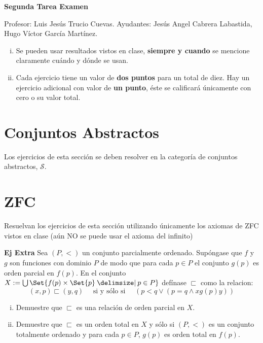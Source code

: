 \documentclass[11pt]{article}
\providecommand\st{\;|\;}
\newcommand\SetSymbol[1][]{%
    \nonscript\:#1\vert
    \allowbreak
    \nonscript\:
    \mathopen{}}
\renewcommand\st{\SetSymbol[\delimsize]}
\renewcommand\st{\SetSymbol[\delimsize]}
\newcommand{\topos}[1]{\mathscr{#1}}
\begin{document}
    \begin{center}
      \Huge \textbf{Segunda Tarea Examen} \\
    \end{center}
    \begin{flushright}
      \footnotesize Profesor: Luis Jesús Trucio Cuevas. \hfill Ayudantes: Jesús Angel Cabrera Labastida,\\
      \hfill Hugo Víctor García Martínez.
    \end{flushright}
    \footnotesize
    \begin{enumerate}[i)]
      \item Se pueden usar resultados vistos en clase, \textbf{siempre y cuando} se mencione claramente cuándo y dónde se usan.
      \item Cada ejercicio tiene un valor de \textbf{dos puntos} para un total de diez. Hay un ejercicio adicional con valor de \textbf{un punto}, éste se calificará únicamente con cero o su valor total.
  \end{enumerate}\normalsize

    \section*{Conjuntos Abstractos}
    Los ejercicios de esta sección se deben resolver en la categoría de
    conjuntos abstractos, \(\topos{S}\).
    
    
    \section*{ZFC}
    Resuelvan los ejercicios de esta sección utilizando únicamente los axiomas de ZFC vistos en clase (aún NO se puede usar el axioma del infinito)
    
     \vspace{.5cm}

    \noindent \textbf{Ej Extra} Sea $(P,<)$ un conjunto parcialmente ordenado. Supóngase que $f$ y $g$ son funciones con dominio $P$ de modo que para cada $p \in P$ el conjunto $g(p)$ es orden parcial en $f(p)$. En el conjunto $X:=\bigcup\Set{ f(p) \times \Set{p} \st p \in P  }$ defínase $\sqsubset$ como la relacion:
    \[ (x,p) \sqsubset (y,q) \quad \text{ si y sólo si } \quad \left( p < q \lor \left( p=q \land x \mathrel{g(p)} y  \right) \right) \]
    \begin{enumerate}[i)]
      \item Demuestre que $\sqsubset$ es una relación de orden parcial en $X$.
      \item Demuestre que $\sqsubset$ es un orden total en $X$ y sólo si $(P,<)$ es un conjunto totalmente ordenado y para cada $p \in P$, $g(p)$ es orden total en $f(p)$.
    \end{enumerate}

\end{document}
